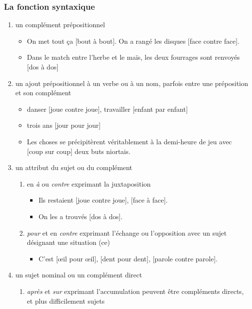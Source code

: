 \documentclass[UTF8]{report}
\begin{document}
\subsubsection{La fonction syntaxique}
\begin{enumerate}
    \item un complément prépositionnel
    \begin{itemize}
        \item On met tout ça [bout à bout]. On a rangé les disques [face contre face].
        \item Dans le match entre l’herbe et le maïs, les deux fourrages sont renvoyés [dos à dos]
    \end{itemize}
    \item un ajout prépositionnel à un verbe ou à un nom, parfois entre une préposition et son complément
    \begin{itemize}
        \item danser [joue contre joue], travailler [enfant par enfant]
        \item trois ans [jour pour jour]
        \item Les choses se précipitèrent véritablement à la demi-heure de jeu avec [coup sur coup] deux buts niortais.
    \end{itemize}
    \item un attribut du sujet ou du complément
    \begin{enumerate}
        \item en \textit{à} ou \textit{contre} exprimant la juxtaposition
        \begin{itemize}
            \item Ils restaient [joue contre joue], [face à face].
            \item On les a trouvés [dos à dos].
        \end{itemize}
        \item \textit{pour} et en \textit{contre} exprimant l’échange ou l’opposition avec un sujet désignant une situation (ce)
        \begin{itemize}
            \item C’est [œil pour œil], [dent pour dent], [parole contre parole].
        \end{itemize}
    \end{enumerate}
    \item un sujet nominal ou un complément direct
    \begin{enumerate}
        \item \textit{après} et \textit{sur} exprimant l’accumulation peuvent être compléments directs, et plus difficilement sujets

\end{enumerate}
\end{enumerate}
\end{document}
